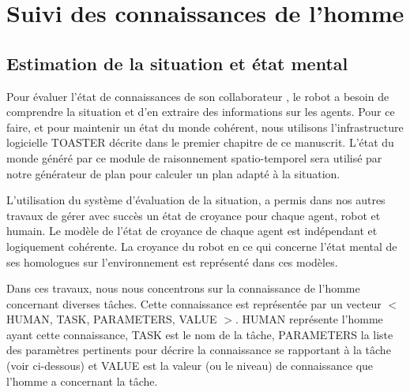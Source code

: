 \documentclass[a4paper,11pt,twoside]{StyleThese}
\begin{document}


\section{Suivi des connaissances de l'homme}

\subsection{Estimation de la situation et état mental}

Pour évaluer l'état de connaissances de son collaborateur , le robot a besoin de comprendre la situation et d'en extraire des informations sur les agents.
Pour ce faire, et pour maintenir un état du monde cohérent, nous utilisons l'infrastructure logicielle TOASTER décrite dans le premier chapitre de ce manuscrit. L'état du monde généré par ce module de raisonnement spatio-temporel sera utilisé par notre générateur de plan pour calculer un plan adapté à la situation.



L'utilisation du système d'évaluation de la situation, a permis dans nos autres travaux de gérer avec succès un état de croyance pour chaque agent, robot et humain. Le modèle de l'état de croyance de chaque agent est indépendant et logiquement cohérente. La croyance du robot en ce qui concerne l'état mental de ses homologues sur l'environnement est représenté dans ces modèles.

Dans ces travaux, nous nous concentrons sur la connaissance de l'homme concernant diverses tâches. Cette connaissance est représentée par un vecteur $<$ HUMAN, TASK, PARAMETERS, VALUE $> $.
HUMAN représente l'homme ayant cette connaissance, TASK est le nom de la tâche, PARAMETERS la liste des paramètres pertinents pour décrire la connaissance se rapportant à la tâche (voir ci-dessous) et VALUE est la valeur (ou le niveau) de connaissance que l'homme a concernant la tâche.
\end{document}
